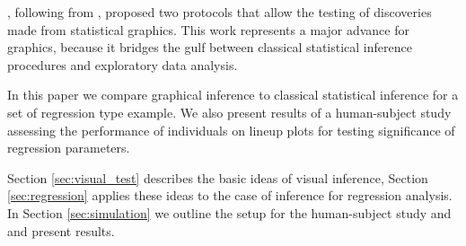 \documentclass{article}
\begin{document}
\citet{buja:2009}, following from \cite{gelman:2004}, proposed two protocols that allow the testing of discoveries made from statistical graphics. This work represents a major advance for graphics, because it bridges the gulf between classical statistical inference procedures and exploratory data analysis.

In this paper we compare graphical inference to classical statistical inference for a set of regression type example. We also present results of a human-subject study assessing the performance of individuals on lineup plots \citep{buja:2009} for testing significance of regression parameters. 

Section \ref{sec:visual_test} describes the basic ideas of visual inference, Section \ref{sec:regression} applies these ideas to the case of inference for regression analysis. In Section \ref{sec:simulation} we outline the setup for the human-subject study and  and present results. 
\end{document}
